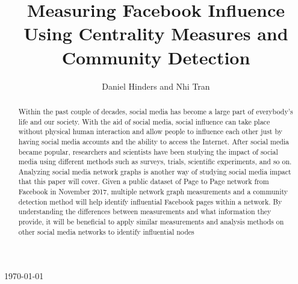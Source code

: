 \documentclass[11pt,twocolumn]{article}
\begin{document}
\begin{titlepage}
    
    
    \vfill\vfill\vfill %
    
    {\large\today} %
    
    
     
    
    \vfill %
    
\end{titlepage}

\title{Measuring Facebook Influence Using Centrality Measures and Community Detection}
\author{Daniel Hinders and Nhi Tran}
\maketitle
\begin{abstract}
Within the past couple of decades, social media has become a large part of everybody's life and our society. With the aid of social media, social influence can take place without physical human interaction and allow people to influence each other just by having social media accounts and the ability to access the Internet. After social media became popular, researchers and scientists have been studying the impact of social media using different methods such as surveys, trials, scientific experiments, and so on. Analyzing social media network graphs is another way of studying social media impact that this paper will cover. Given a public dataset of Page to Page network from Facebook in November 2017, multiple network graph measurements and a community detection method will help identify influential Facebook pages within a network. By understanding the differences between measurements and what information they provide, it will be beneficial to apply similar measurements and analysis methods on other social media networks to identify influential nodes\end{abstract}
\end{document}
